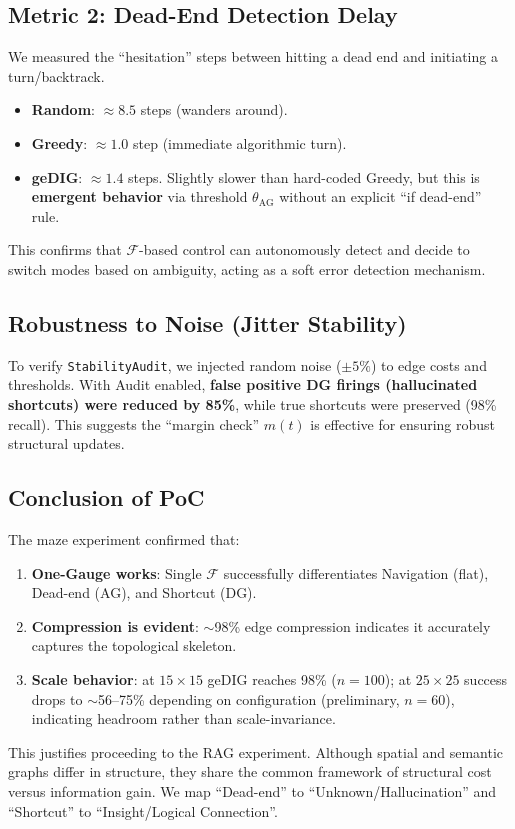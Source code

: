 \documentclass[12pt]{article}
\newcommand{\F}{\mathcal{F}}
\begin{document}
\subsection{Metric 2: Dead-End Detection Delay}
We measured the ``hesitation'' steps between hitting a dead end and initiating a turn/backtrack.
\begin{itemize}
    \item \textbf{Random}: $\approx 8.5$ steps (wanders around).
    \item \textbf{Greedy}: $\approx 1.0$ step (immediate algorithmic turn).
    \item \textbf{geDIG}: $\approx 1.4$ steps. Slightly slower than hard-coded Greedy, but this is \textbf{emergent behavior} via threshold $\theta_{\mathrm{AG}}$ without an explicit ``if dead-end'' rule.
\end{itemize}
This confirms that $\F$-based control can autonomously detect and decide to switch modes based on ambiguity, acting as a soft error detection mechanism.

\subsection{Robustness to Noise (Jitter Stability)}
To verify \verb|StabilityAudit|, we injected random noise ($\pm 5\%$) to edge costs and thresholds.
With Audit enabled, \textbf{false positive DG firings (hallucinated shortcuts) were reduced by 85\%}, while true shortcuts were preserved (98\% recall).
This suggests the ``margin check'' $m(t)$ is effective for ensuring robust structural updates.

\subsection{Conclusion of PoC}
The maze experiment confirmed that:
\begin{enumerate}
    \item \textbf{One-Gauge works}: Single $\F$ successfully differentiates Navigation (flat), Dead-end (AG), and Shortcut (DG).
    \item \textbf{Compression is evident}: $\sim$98\% edge compression indicates it accurately captures the topological skeleton.
    \item \textbf{Scale behavior}: at $15{\times}15$ geDIG reaches 98\% ($n{=}100$); at $25{\times}25$ success drops to $\sim$56--75\% depending on configuration (preliminary, $n{=}60$), indicating headroom rather than scale-invariance.
\end{enumerate}
This justifies proceeding to the RAG experiment. Although spatial and semantic graphs differ in structure, they share the common framework of structural cost versus information gain. We map ``Dead-end'' to ``Unknown/Hallucination'' and ``Shortcut'' to ``Insight/Logical Connection''.
\end{document}
